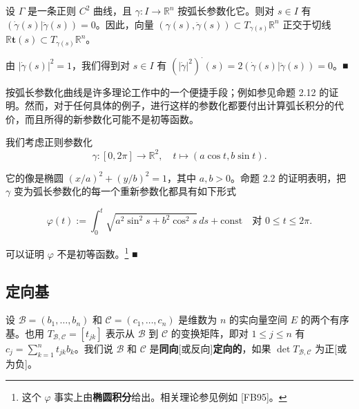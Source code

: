 \begin{remark}

\begin{items}
\item

设 $ \Gamma $ 是一条正则 $ C^2 $ 曲线，且 $ \gamma : I \to \mathbb{R}^n $ 按弧长参数化它。则对 $ s \in I $ 有 $ (\dot\gamma(s)|\ddot\gamma(s)) = 0 $。因此，向量 $ (\gamma(s), \ddot\gamma(s)) \subset T_{\gamma(s)}\mathbb{R}^n $ 正交于切线 $ \mathbb{R}\mathbf{t}(s) \subset T_{\gamma(s)}\mathbb{R}^n $。

\proofhead
由 $ |\dot\gamma(s)|^2 = 1 $，我们得到对 $ s \in I $ 有 $ (|\dot\gamma|^2)^{\cdot}(s) = 2(\dot\gamma(s)|\ddot\gamma(s)) = 0 $。\nobreak\hspace{0.35em}■
\item

按弧长参数化曲线是许多理论工作中的一个便捷手段；例如参见命题 2.12 的证明。然而，对于任何具体的例子，进行这样的参数化都要付出计算弧长积分的代价，而且所得的新参数化可能不是初等函数。

\proofhead
我们考虑正则参数化
\[
\gamma : [0, 2\pi] \to \mathbb{R}^2 , \quad t \mapsto (a\cos t, b\sin t) .
\]

它的像是椭圆 $ (x/a)^2 + (y/b)^2 = 1 $，其中 $ a, b > 0 $。命题 2.2 的证明表明，把 $ \gamma $ 变为弧长参数化的每一个重新参数化都具有如下形式

\[
\varphi(t) := \int_0^t \sqrt{a^2\sin^2 s + b^2\cos^2 s} \, ds + \mathrm{const} \quad \text{对 } 0 \le t \le 2\pi .
\]

可以证明 $ \varphi $ 不是初等函数。\footnote{这个 $ \varphi $ 事实上由\textbf{椭圆积分}给出。相关理论参见例如 [FB95]。} \nobreak\hspace{0.35em}■

\end{items}

\end{remark}

\subsection*{定向基}

设 $ \mathcal{B} = (b_1, \ldots, b_n) $ 和 $ \mathcal{C} = (c_1, \ldots, c_n) $ 是维数为 $ n $ 的实向量空间 $ E $ 的两个有序基。也用 $ T_{\mathcal{B},\mathcal{C}} = [t_{jk}] $ 表示从 $ \mathcal{B} $ 到 $ \mathcal{C} $ 的变换矩阵，即对 $ 1 \le j \le n $ 有 $ c_j = \sum_{k=1}^{n} t_{jk}b_k $。我们说 $ \mathcal{B} $ 和 $ \mathcal{C} $ 是\textbf{同向}[或反向]\textbf{定向的}，如果 $ \det T_{\mathcal{B},\mathcal{C}} $ 为正[或为负]。

